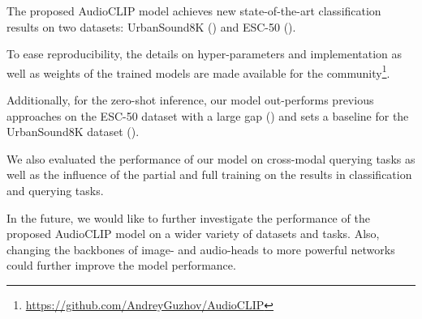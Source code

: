 \documentclass[runningheads]{llncs}
\newif\ifreview
\begin{document}
The proposed \mbox{AudioCLIP} model achieves new state-of-the-art classification results on two datasets: \mbox{UrbanSound8K} () and \mbox{ESC-50} ().
\ifreview
To ease reproducibility, the details on hyper-parameters and implementation as well as weights of the trained models are made available for the community\footnote[1]{See supplementary materials}.
\else
To ease reproducibility, the details on hyper-parameters and implementation as well as weights of the trained models are made available for the community\footnote[1]{\url{https://github.com/AndreyGuzhov/AudioCLIP}}.
\fi

Additionally, for the zero-shot inference, our model out-performs previous approaches on the \mbox{ESC-50} dataset with a large gap () and sets a baseline for the \mbox{UrbanSound8K} dataset ().

We also evaluated the performance of our model on cross-modal querying tasks as well as the influence of the partial and full training on the results in classification and querying tasks.

In the future, we would like to further investigate the performance of the proposed \mbox{AudioCLIP} model on a wider variety of datasets and tasks.
Also, changing the backbones of image- and audio-heads to more powerful networks could further improve the model performance.



\end{document}
